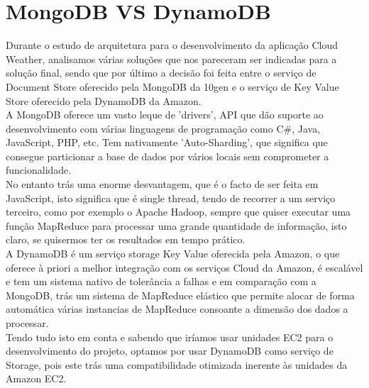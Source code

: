 \section{MongoDB VS DynamoDB}
	Durante o estudo de arquitetura para o desenvolvimento da aplicação Cloud Weather, analisamos várias soluções que nos pareceram ser indicadas para a solução final, sendo que por último a decisão foi feita entre o serviço de Document Store oferecido pela MongoDB da 10gen e o serviço de Key Value Store oferecido pela DynamoDB da Amazon.\\
	A MongoDB oferece um vasto leque de 'drivers', API que dão suporte ao desenvolvimento com várias linguagens de programação como C\#, Java, JavaScript, PHP, etc. Tem nativamente 'Auto-Sharding', que significa que consegue particionar a base de dados por vários locais sem comprometer a funcionalidade.\\
	No entanto trás uma enorme desvantagem, que é o facto de ser feita em JavaScript, isto significa que é single thread, tendo de recorrer a um serviço terceiro, como por exemplo o Apache Hadoop, sempre que quiser executar uma função MapReduce para processar uma grande quantidade de informação, isto claro, se quisermos ter os resultados em tempo prático.\\
	A DynamoDB é um serviço storage Key Value oferecida pela Amazon, o que oferece à priori a melhor integração com os serviços Cloud da Amazon, é escalável e tem um sistema nativo de tolerância a falhas e em comparação com a MongoDB, trás um sistema de MapReduce elástico que permite alocar de forma automática várias instancias de MapReduce consoante a dimensão dos dados a processar.\\
	Tendo tudo isto em conta e sabendo que iríamos usar unidades EC2 para o desenvolvimento do projeto, optamos por usar DynamoDB como serviço de Storage, pois este trás uma compatibilidade otimizada inerente às unidades da Amazon EC2.




